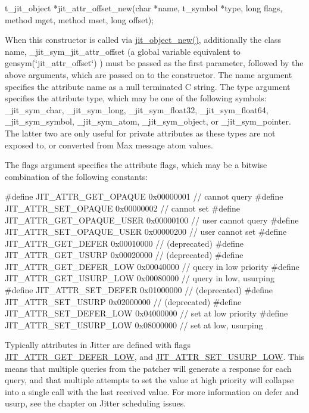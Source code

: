 \begin{DoxyCode}
t_jit_object *jit_attr_offset_new(char *name, t_symbol *type, long flags,
   method mget, method mset, long offset);
\end{DoxyCode}


When this constructor is called via \hyperlink{group__objectmod_gabde2eb49750992ec4125af862b402342}{jit\_\-object\_\-new()}, additionally the class name, \_\-jit\_\-sym\_\-jit\_\-attr\_\-offset (a global variable equivalent to gensym(\char`\"{}jit\_\-attr\_\-offset\char`\"{}) ) must be passed as the first parameter, followed by the above arguments, which are passed on to the constructor. The name argument specifies the attribute name as a null terminated C string. The type argument specifies the attribute type, which may be one of the following symbols: \_\-jit\_\-sym\_\-char, \_\-jit\_\-sym\_\-long, \_\-jit\_\-sym\_\-float32, \_\-jit\_\-sym\_\-float64, \_\-jit\_\-sym\_\-symbol, \_\-jit\_\-sym\_\-atom, \_\-jit\_\-sym\_\-object, or \_\-jit\_\-sym\_\-pointer. The latter two are only useful for private attributes as these types are not exposed to, or converted from Max message atom values.

The flags argument specifies the attribute flags, which may be a bitwise combination of the following constants:


\begin{DoxyCode}
#define JIT_ATTR_GET_OPAQUE           0x00000001 // cannot query
#define JIT_ATTR_SET_OPAQUE           0x00000002 // cannot set
#define JIT_ATTR_GET_OPAQUE_USER      0x00000100 // user cannot query
#define JIT_ATTR_SET_OPAQUE_USER      0x00000200 // user cannot set
#define JIT_ATTR_GET_DEFER            0x00010000 // (deprecated)
#define JIT_ATTR_GET_USURP            0x00020000 // (deprecated)
#define JIT_ATTR_GET_DEFER_LOW        0x00040000 // query in low priority
#define JIT_ATTR_GET_USURP_LOW        0x00080000 // query in low, usurping 
#define JIT_ATTR_SET_DEFER            0x01000000 // (deprecated)
#define JIT_ATTR_SET_USURP            0x02000000 // (deprecated)
#define JIT_ATTR_SET_DEFER_LOW        0x04000000 // set at low priority
#define JIT_ATTR_SET_USURP_LOW        0x08000000 // set at low, usurping
\end{DoxyCode}


Typically attributes in Jitter are defined with flags \hyperlink{group__jitter_ga810447020b75b5173d4c6776cd2653d8}{JIT\_\-ATTR\_\-GET\_\-DEFER\_\-LOW}, and \hyperlink{group__jitter_ga2ffda4034665d46f65461d67b1004715}{JIT\_\-ATTR\_\-SET\_\-USURP\_\-LOW}. This means that multiple queries from the patcher will generate a response for each query, and that multiple attempts to set the value at high priority will collapse into a single call with the last received value. For more information on defer and usurp, see the chapter on Jitter scheduling issues.

